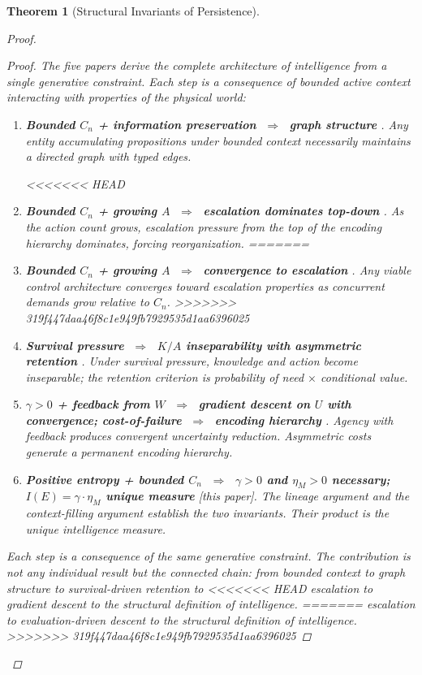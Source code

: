 \documentclass[11pt]{article}
\newtheorem{theorem}{Theorem}
\theoremstyle{definition}
\theoremstyle{remark}
\begin{document}
\begin{theorem}[Structural Invariants of Persistence]
\begin{proof}
\begin{proof}
The five papers derive the complete architecture of intelligence from a
single generative constraint. Each step is a consequence of bounded
active context interacting with properties of the physical world:

\begin{enumerate}
\item \textbf{Bounded $C_n$ + information preservation $\;\Rightarrow\;$
      graph structure} \cite{McCarthy2026a}. Any entity accumulating
      propositions under bounded context necessarily maintains a
      directed graph with typed edges.

<<<<<<< HEAD
\item \textbf{Bounded $C_n$ + growing $A$ $\;\Rightarrow\;$ escalation
      dominates top-down} \cite{McCarthy2026b}. As the action count
      grows, escalation pressure from the top of the encoding hierarchy
      dominates, forcing reorganization.
=======
\item \textbf{Bounded $C_n$ + growing $A$ $\;\Rightarrow\;$ convergence
      to escalation} \cite{McCarthy2026b}. Any viable control
      architecture converges toward escalation properties as concurrent
      demands grow relative to $C_n$.
>>>>>>> 319f447daa46f8c1e949fb7929535d1aa6396025

\item \textbf{Survival pressure $\;\Rightarrow\;$ $K/A$ inseparability
      with asymmetric retention} \cite{McCarthy2026c}. Under survival
      pressure, knowledge and action become inseparable; the retention
      criterion is probability of need $\times$ conditional value.

\item \textbf{$\gamma > 0$ + feedback from $W$ $\;\Rightarrow\;$ gradient
      descent on $U$ with convergence; cost-of-failure $\;\Rightarrow\;$
      encoding hierarchy} \cite{McCarthy2026d}. Agency with feedback
      produces convergent uncertainty reduction. Asymmetric costs
      generate a permanent encoding hierarchy.

\item \textbf{Positive entropy + bounded $C_n$ $\;\Rightarrow\;$
      $\gamma > 0$ and $\eta_M > 0$ necessary; $I(E) = \gamma \cdot \eta_M$
      unique measure} [this paper]. The lineage argument and the
      context-filling argument establish the two invariants. Their
      product is the unique intelligence measure.
\end{enumerate}

Each step is a consequence of the same generative constraint. The
contribution is not any individual result but the connected chain: from
bounded context to graph structure to survival-driven retention to
<<<<<<< HEAD
escalation to gradient descent to the structural definition of
intelligence.
=======
escalation to evaluation-driven descent to the structural definition
of intelligence.
>>>>>>> 319f447daa46f8c1e949fb7929535d1aa6396025


\end{proof}
\end{proof}
\end{theorem}
\end{document}
